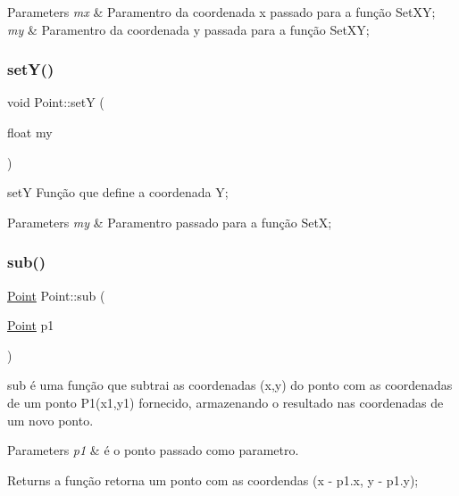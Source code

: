 \begin{DoxyParams}{Parameters}
{\em mx} & Paramentro da coordenada x passado para a função Set\+XY; \\
\hline
{\em my} & Paramentro da coordenada y passada para a função Set\+XY; \\
\hline
\end{DoxyParams}
\mbox{\label{class_point_a756b3f64d961a5059302f42e1fcf2332}} 
\subsubsection{\texorpdfstring{set\+Y()}{setY()}}
{\footnotesize\ttfamily void Point\+::setY (\begin{DoxyParamCaption}\item[{float}]{my }\end{DoxyParamCaption})}



setY Função que define a coordenada Y; 


\begin{DoxyParams}{Parameters}
{\em my} & Paramentro passado para a função SetX; \\
\hline
\end{DoxyParams}
\mbox{\label{class_point_a9cf2c53b0a4e6282a6712824bb4e9b00}} 
\subsubsection{\texorpdfstring{sub()}{sub()}}
{\footnotesize\ttfamily \mbox{\hyperlink{class_point}{Point}} Point\+::sub (\begin{DoxyParamCaption}\item[{\mbox{\hyperlink{class_point}{Point}}}]{p1 }\end{DoxyParamCaption})}



sub é uma função que subtrai as coordenadas (x,y) do ponto com as coordenadas de um ponto P1(x1,y1) fornecido, armazenando o resultado nas coordenadas de um novo ponto. 


\begin{DoxyParams}{Parameters}
{\em p1} & é o ponto passado como parametro. \\
\hline
\end{DoxyParams}
\begin{DoxyReturn}{Returns}
a função retorna um ponto com as coordendas (x -\/ p1.\+x, y -\/ p1.\+y); 
\end{DoxyReturn}
\mbox{\label{class_point_ad9676e36f3444534b609e3c68422239a}} 
